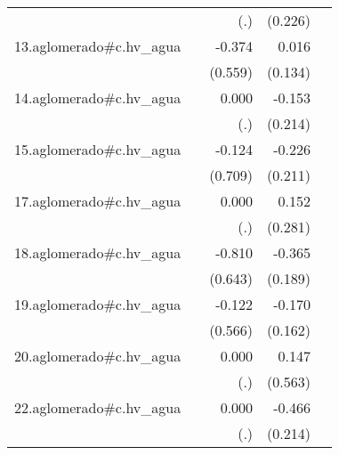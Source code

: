 {\begin{longtable}{l*{4}{D{.}{.}{-1}}}
            &                     &         (.)         &     (0.226)         &                     \\
\addlinespace
13.aglomerado#c.hv\_agua&                     &      -0.374         &       0.016         &                     \\
            &                     &     (0.559)         &     (0.134)         &                     \\
\addlinespace
14.aglomerado#c.hv\_agua&                     &       0.000         &      -0.153         &                     \\
            &                     &         (.)         &     (0.214)         &                     \\
\addlinespace
15.aglomerado#c.hv\_agua&                     &      -0.124         &      -0.226         &                     \\
            &                     &     (0.709)         &     (0.211)         &                     \\
\addlinespace
17.aglomerado#c.hv\_agua&                     &       0.000         &       0.152         &                     \\
            &                     &         (.)         &     (0.281)         &                     \\
\addlinespace
18.aglomerado#c.hv\_agua&                     &      -0.810         &      -0.365         &                     \\
            &                     &     (0.643)         &     (0.189)         &                     \\
\addlinespace
19.aglomerado#c.hv\_agua&                     &      -0.122         &      -0.170         &                     \\
            &                     &     (0.566)         &     (0.162)         &                     \\
\addlinespace
20.aglomerado#c.hv\_agua&                     &       0.000         &       0.147         &                     \\
            &                     &         (.)         &     (0.563)         &                     \\
\addlinespace
22.aglomerado#c.hv\_agua&                     &       0.000         &      -0.466\sym{*}  &                     \\
            &                     &         (.)         &     (0.214)         &                     \\

\end{longtable}}
